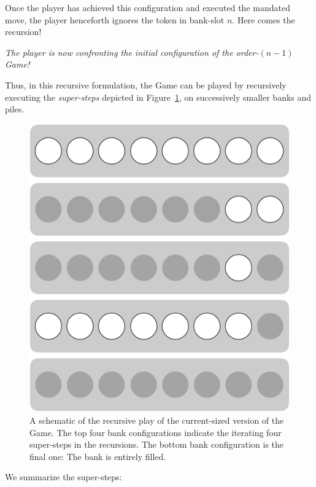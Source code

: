 \smallskip

Once the player has achieved this configuration and executed the mandated move, the player henceforth ignores the token in bank-slot $n$.   Here comes the recursion!

\medskip

{\em The player is now confronting the initial configuration of the order-$(n-1)$ Game!}

\medskip

Thus, in this recursive formulation, the Game can be played by recursively executing the {\em super-steps} depicted in Figure~\ref{fig:jeujetonsPrinciple}, on successively smaller banks and piles.
\begin{figure}[htb]
\begin{center}
        \includegraphics[scale=0.3]{FiguresMaths/GameTokenPrinciple.png}
\caption{A schematic of the recursive play of the current-sized version of the Game.  The top four bank configurations indicate the iterating four super-steps in the recursions.  The bottom bank configuration is the final one: The bank is entirely filled. }
        \label{fig:jeujetonsPrinciple}
\end{center}
\end{figure}
We summarize the super-steps:
